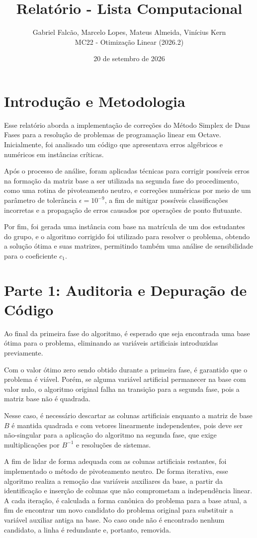 \documentclass[12pt]{article}
\title{Relatório - Lista Computacional}
\author{Gabriel Falcão, Marcelo Lopes, Mateus Almeida, Vinícius Kern\\ 
MC22 - Otimização Linear (2026.2)}
\date{20 de setembro de 2026}
\begin{document}
\maketitle

\section*{Introdução e Metodologia}

Esse relatório aborda a implementação de correções do Método Simplex de Duas Fases para a resolução de problemas de programação linear em Octave. Inicialmente, foi analisado um código que apresentava erros algébricos e numéricos em instâncias críticas.

Após o processo de análise, foram aplicadas técnicas para corrigir possíveis erros na formação da matriz base a ser utilizada na segunda fase do procedimento, como uma rotina de pivoteamento neutro, e correções numéricas por meio de um parâmetro de tolerância $\epsilon=10^{-9}$, a fim de mitigar possíveis classificações incorretas e a propagação de erros causados por operações de ponto flutuante.

Por fim, foi gerada uma instância com base na matrícula de um dos estudantes do grupo, e o algoritmo corrigido foi utilizado para resolver o problema, obtendo a solução ótima e suas matrizes, permitindo também uma análise de sensibilidade para o coeficiente $c_1$.

\section*{Parte 1: Auditoria e Depuração de Código}
Ao final da primeira fase do algoritmo, é esperado que seja encontrada uma base ótima para o problema, eliminando as variáveis artificiais introduzidas previamente. 

Com o valor ótimo zero sendo obtido durante a primeira fase, é garantido que o problema é viável. Porém, se alguma variável artificial permanecer na base com valor nulo, o algoritmo original falha na transição para a segunda fase, pois a matriz base não é quadrada.

Nesse caso, é necessário descartar as colunas artificiais enquanto a matriz de base $B$ é mantida quadrada e com vetores linearmente independentes, pois deve ser não-singular para a aplicação do algoritmo na segunda fase, que exige multiplicações por $B^{-1}$ e resoluções de sistemas.

A fim de lidar de forma adequada com as colunas artificiais restantes, foi implementado o método de pivoteamento neutro. De forma iterativa, esse algoritmo realiza a remoção das variáveis auxiliares da base, a partir da identificação e inserção de colunas que não comprometam a independência linear. A cada iteração, é calculada a forma canônica do problema para a base atual, a fim de encontrar um novo candidato do problema original para substituir a variável auxiliar antiga na base. No caso onde não é encontrado nenhum candidato, a linha é redundante e, portanto, removida.
\end{document}
